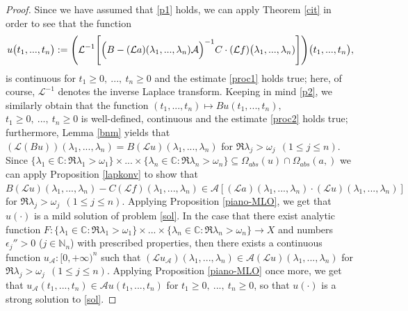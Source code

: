 \documentclass{amsart}
\theoremstyle{definition}
\theoremstyle{remark}
\numberwithin{equation}{section}
\begin{document}
\begin{proof}
Since we have assumed that \eqref{p1} holds,
we can apply Theorem \ref{cit} in order to see that the function 
\begin{align}\label{sc}
u\bigl(t_{1},...,t_{n}\bigr):=\Biggl({\mathcal L}^{-1}\Biggl[ \Bigl( B-({\mathcal L}a)( \lambda_{1},...,\lambda_{n}){\mathcal A} \Bigr)^{-1}C\cdot ({\mathcal L}f)\bigl( \lambda_{1},...,\lambda_{n})\Biggr]\Biggr)\bigl(t_{1},...,t_{n}\bigr),
\end{align}
is continuous for $t_{1}\geq 0,\ ...,\ t_{n}\geq 0$ and the estimate \eqref{proc1} holds true; here, of course, ${\mathcal L}^{-1}$ denotes the inverse Laplace transform. Keeping in mind \eqref{p2}, we similarly obtain that the function $(t_{1},...,t_{n}) \mapsto
Bu(t_{1},...,t_{n}), $ $t_{1}\geq 0,\ ...,\ t_{n}\geq 0$ is well-defined, continuous and the estimate \eqref{proc2} holds true; furthermore, 
Lemma \ref{bnm} yields that $({\mathcal L}(Bu))(\lambda_{1},...,\lambda_{n})=B({\mathcal L}u)(\lambda_{1},...,\lambda_{n})$ for $\Re \lambda_{j}>\omega_{j}\ \ (1\leq j\leq n).$ Since $\{\lambda_{1} \in {\mathbb C} : \Re \lambda_{1}>\omega_{1}\} \times ... \times \{\lambda_{n} \in {\mathbb C} : \Re \lambda_{n}>\omega_{n}\}\subseteq \Omega_{abs}(u) \cap \Omega_{abs}(a,)$ we can apply Proposition \ref{lapkonv} to show that $B({\mathcal L}u)(\lambda_{1},...,\lambda_{n})-C({\mathcal L}f)(\lambda_{1},...,\lambda_{n})\in {\mathcal A}[({\mathcal L}a)(\lambda_{1},...,\lambda_{n})\cdot ({\mathcal L}u)(\lambda_{1},...,\lambda_{n})]$ for $\Re \lambda_{j}>\omega_{j}\ \ (1\leq j\leq n).$ Applying Proposition \ref{piano-MLO}, we get that $u(\cdot)$ is a mild solution of problem \eqref{sol}. In the case that there exist analytic function $F: \{\lambda_{1} \in {\mathbb C} : \Re \lambda_{1}>\omega_{1}\} \times ... \times \{\lambda_{n} \in {\mathbb C} : \Re \lambda_{n}>\omega_{n}\} \rightarrow X$ and numbers $\epsilon_{j}''>0$ ($j\in {\mathbb N}_{n}$) with prescribed properties, then there exists a continuous function $u_{{\mathcal A}} : [0,+\infty)^{n}$ such that $({\mathcal L}u_{{\mathcal A}})(\lambda_{1},...,\lambda_{n}) \in {\mathcal A}({\mathcal L}u)(\lambda_{1},...,\lambda_{n})$ for $\Re \lambda_{j}>\omega_{j}\ \ (1\leq j\leq n).$ Applying Proposition \ref{piano-MLO} once more, we get that
$u_{{\mathcal A}}(t_{1},...,t_{n})\in {\mathcal A}u(t_{1},...,t_{n})$ for $t_{1}\geq 0,\ ...,\ t_{n}\geq 0$, so that $u(\cdot)$ is a strong solution to \eqref{sol}.
\end{proof}
\end{document}

